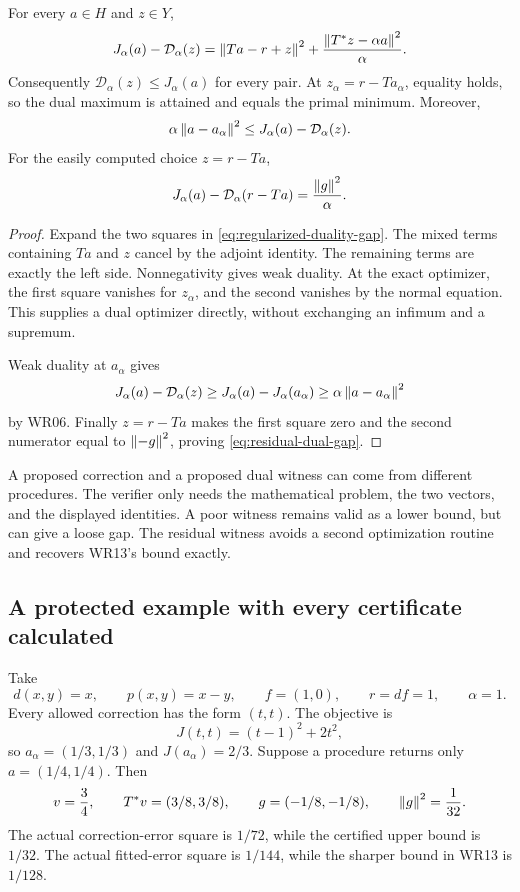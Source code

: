 \begin{theorem}\label{WR14}
For every $a\in H$ and $z\in Y$,
\begin{equation}\label{eq:regularized-duality-gap}
 J_\alpha(a)-\mathcal D_\alpha(z)
 =\left\lVert Ta-r+z\right\rVert^2+
   \frac{\left\lVert T^*z-\alpha a\right\rVert^2}{\alpha}.
\end{equation}
Consequently $\mathcal D_\alpha(z)\le J_\alpha(a)$ for every pair. At
$z_\alpha=r-Ta_\alpha$, equality holds, so the dual maximum is attained and equals the primal minimum. Moreover,
\[
 \alpha\left\lVert a-a_\alpha\right\rVert^2
 \le J_\alpha(a)-\mathcal D_\alpha(z).
\]
For the easily computed choice $z=r-Ta$,
\begin{equation}\label{eq:residual-dual-gap}
 J_\alpha(a)-\mathcal D_\alpha(r-Ta)=\frac{\left\lVert g\right\rVert^2}{\alpha}.
\end{equation}
\end{theorem}
\begin{proof}
Expand the two squares in \eqref{eq:regularized-duality-gap}. The mixed terms containing $Ta$ and $z$ cancel by the adjoint identity. The remaining terms are exactly the left side. Nonnegativity gives weak duality. At the exact optimizer, the first square vanishes for $z_\alpha$, and the second vanishes by the normal equation. This supplies a dual optimizer directly, without exchanging an infimum and a supremum.

Weak duality at $a_\alpha$ gives
\[
 J_\alpha(a)-\mathcal D_\alpha(z)
 \ge J_\alpha(a)-J_\alpha(a_\alpha)
 \ge\alpha\left\lVert a-a_\alpha\right\rVert^2
\]
by WR06. Finally $z=r-Ta$ makes the first square zero and the second numerator equal to $\left\lVert-g\right\rVert^2$, proving \eqref{eq:residual-dual-gap}.
\end{proof}

A proposed correction and a proposed dual witness can come from different procedures. The verifier only needs the mathematical problem, the two vectors, and the displayed identities. A poor witness remains valid as a lower bound, but can give a loose gap. The residual witness avoids a second optimization routine and recovers WR13's bound exactly.

\subsection{A protected example with every certificate calculated}
Take
\[
 d(x,y)=x,\qquad p(x,y)=x-y,\qquad f=(1,0),\qquad r=df=1,\qquad\alpha=1.
\]
Every allowed correction has the form $(t,t)$. The objective is
\[
 J(t,t)=(t-1)^2+2t^2,
\]
so $a_\alpha=(1/3,1/3)$ and $J(a_\alpha)=2/3$. Suppose a procedure returns only $a=(1/4,1/4)$. Then
\[
 v=\frac34,\qquad T^*v=(3/8,3/8),\qquad
 g=(-1/8,-1/8),\qquad\left\lVert g\right\rVert^2=\frac1{32}.
\]
The actual correction-error square is $1/72$, while the certified upper bound is $1/32$. The actual fitted-error square is $1/144$, while the sharper bound in WR13 is $1/128$.

